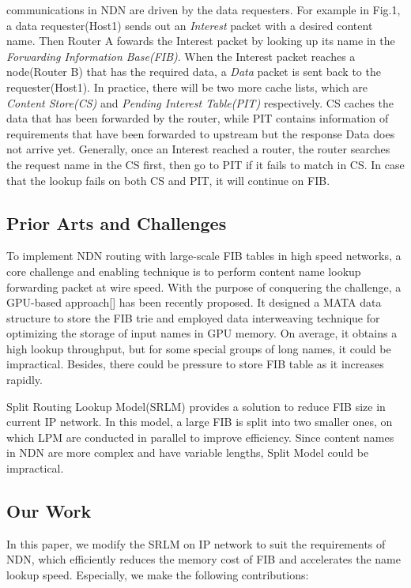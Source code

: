 \documentclass[twocolumn]{article}
\begin{document}
communications in NDN are driven by the data requesters. For example in Fig.1, a data requester(Host1) sends out an \textit{Interest} packet with a desired content name. Then Router A fowards the  Interest packet by looking up its name in the \textit{Forwarding Information Base(FIB)}. When the Interest packet reaches a node(Router B) that has the required data, a \textit{Data} packet is sent back to the requester(Host1). In practice, there will be two more cache lists, which are \textit{Content Store(CS)} and \textit{Pending Interest Table(PIT)} respectively. CS caches the data that has been forwarded by the router, while PIT contains information of requirements that have been forwarded to upstream but the response Data does not arrive yet. Generally, once an Interest reached a router, the router searches the request name in the CS first, then go to PIT if it fails to match in CS. In case that the lookup fails on both CS and PIT, it will continue on FIB.

\subsection{Prior Arts and Challenges}
To implement NDN routing with large-scale FIB tables in high speed networks, a core challenge and enabling technique is to perform content name lookup forwarding packet at wire speed. With the purpose of conquering the challenge, a GPU-based approach[] has been recently proposed. It designed a MATA data structure to store the FIB trie and employed data interweaving technique for optimizing the storage of input names in GPU memory. On average, it obtains a high lookup throughput, but for some special groups of long names, it could be impractical. Besides, there could be pressure to store FIB table as it increases rapidly.

Split Routing Lookup Model(SRLM) provides a solution to reduce FIB size in current IP network. In this model, a large FIB is split into two smaller ones, on which LPM are conducted in parallel to improve efficiency. Since content names in NDN are more complex and have variable lengths, Split Model could be impractical.

\subsection{Our Work}

In this paper, we modify the SRLM on IP network to suit the requirements of NDN, which efficiently reduces the memory cost of FIB and accelerates the name lookup speed. Especially, we make the following contributions:
\end{document}
